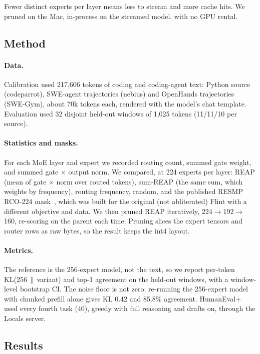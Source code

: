 \documentclass[11pt]{article}
\begin{document}
Fewer distinct experts per layer means less to stream and more cache hits. We pruned on the Mac, in-process on the
streamed model, with no GPU rental.

\subsection{Method}

\paragraph{Data.} Calibration used 217,606 tokens of coding and coding-agent text: Python source (codeparrot), SWE-agent
trajectories (nebius) and OpenHands trajectories (SWE-Gym), about 70k tokens each, rendered with the model's chat
template. Evaluation used 32 disjoint held-out windows of 1,025 tokens (11/11/10 per source).

\paragraph{Statistics and masks.} For each MoE layer and expert we recorded routing count, summed gate weight, and summed
gate $\times$ output norm. We compared, at 224 experts per layer: REAP (mean of gate $\times$ norm over routed tokens),
sum-REAP (the same sum, which weights by frequency), routing frequency, random, and the published RESMP RCO-224
mask~\citep{resmp}, which was built for the original (not abliterated) Flint with a different objective and data. We then
pruned REAP iteratively, 224$\to$192$\to$160, re-scoring on the parent each time. Pruning slices the expert tensors and
router rows as raw bytes, so the result keeps the int4 layout.

\paragraph{Metrics.} The reference is the 256-expert model, not the text, so we report per-token KL(256\,$\|$\,variant)
and top-1 agreement on the held-out windows, with a window-level bootstrap CI. The noise floor is not zero: re-running
the 256-expert model with chunked prefill alone gives KL 0.42 and 85.8\% agreement. HumanEval+~\citep{liu2023evalplus,chen2021humaneval}
used every fourth task (40), greedy with full reasoning and drafts on, through the Locals server.

\subsection{Results}
\end{document}
